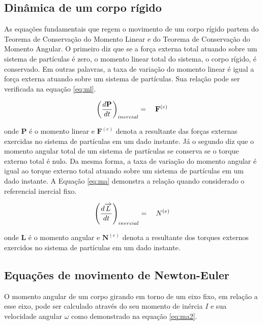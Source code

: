 \documentclass[a4paper, 12pt]{article}
\begin{document}
\subsection{Dinâmica de um corpo rígido}

As equações fundamentais que regem o movimento de um corpo rígido partem do Teorema de Conservação do Momento Linear e do Teorema de Conservação do Momento Angular. O primeiro diz que se a força externa total atuando sobre um sistema de partículas é zero, o momento linear total do sistema, o corpo rígido, é conservado. Em outras palavras, a taxa de variação do momento linear é igual a força externa atuando sobre um sistema de partículas. Sua relação pode ser verificada na equação \ref{eq:ml}.

\begin{equation}
\centering
{ \left(\frac { d\mathbf{P} }{ dt }\right)}_{inercial} = \quad{ \mathbf{F} }^{ (e) }
\label{eq:ml}
\end{equation}

\noindent onde $\mathbf{P}$ é o momento linear e ${ \mathbf{F} }^{ (e) }$ denota a resultante das forças externas exercidas no sistema de partículas em um dado instante. Já o segundo diz que o momento angular total de um sistema de partículas se conserva se o torque externo total é nulo. Da mesma forma, a taxa de variação do momento angular é igual ao torque externo total atuando sobre um sistema de partículas em um dado instante. A Equação \ref{eq:ma} demonstra a relação quando considerado o referencial inercial fixo.

\begin{equation}
\centering
{ \left( \frac { d\overrightarrow { L } }{ dt }  \right)  }_{ inercial }=\quad { N }^{ (e) }
\label{eq:ma}
\end{equation}

\noindent onde $\mathbf{L}$ é o momento angular e ${ \mathbf{N} }^{ (e) }$ denota a resultante dos torques externos exercidos no sistema de partículas em um dado instante. 

\subsection{Equações de movimento de Newton-Euler}

O momento angular de um corpo girando em torno de um eixo fixo, em relação a esse eixo, pode ser calculado através do seu momento de inércia $I$ e sua velocidade angular $\omega$ como demonstrado na equação \ref{eq:ma2}.
\end{document}
